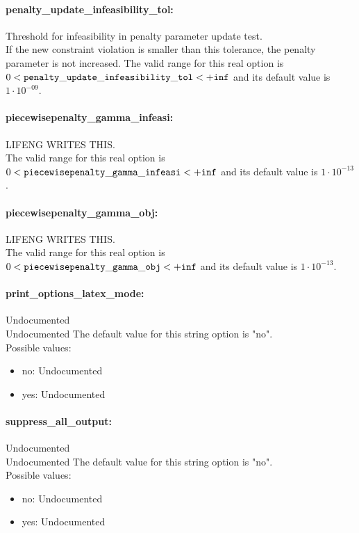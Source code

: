 \paragraph{penalty\_update\_infeasibility\_tol:}\label{sec:penalty_update_infeasibility_tol} Threshold for infeasibility in penalty parameter update test. $\;$ \\
 If the new constraint violation is smaller than
this tolerance, the penalty parameter is not
increased. The valid range for this real option is 
$0 <  {\tt penalty\_update\_infeasibility\_tol } <  {\tt +inf}$
and its default value is $1 \cdot 10^{-09}$.


\paragraph{piecewisepenalty\_gamma\_infeasi:}\label{sec:piecewisepenalty_gamma_infeasi} LIFENG WRITES THIS. $\;$ \\
 The valid range for this real option is 
$0 <  {\tt piecewisepenalty\_gamma\_infeasi } <  {\tt +inf}$
and its default value is $1 \cdot 10^{-13}$.


\paragraph{piecewisepenalty\_gamma\_obj:}\label{sec:piecewisepenalty_gamma_obj} LIFENG WRITES THIS. $\;$ \\
 The valid range for this real option is 
$0 <  {\tt piecewisepenalty\_gamma\_obj } <  {\tt +inf}$
and its default value is $1 \cdot 10^{-13}$.


\paragraph{print\_options\_latex\_mode:}\label{sec:print_options_latex_mode} Undocumented $\;$ \\
 Undocumented
The default value for this string option is "no".
\\ 
Possible values:
\begin{itemize}
   \item no: Undocumented
   \item yes: Undocumented
\end{itemize}

\paragraph{suppress\_all\_output:}\label{sec:suppress_all_output} Undocumented $\;$ \\
 Undocumented
The default value for this string option is "no".
\\ 
Possible values:
\begin{itemize}
   \item no: Undocumented
   \item yes: Undocumented
\end{itemize}

